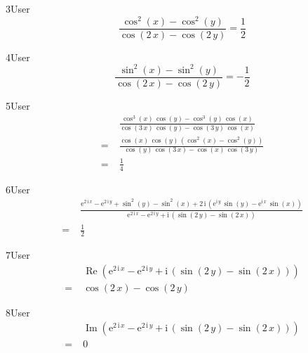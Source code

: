 \begin{espr}{3}{User}{\verificata}
\[
\frac{\cos^{2}\!\left(x\right) - \cos^{2}\!\left(y\right)}{\cos\!\left(2\, x\right) - \cos\!\left(2\, y\right)} = \frac{1}{2}
\]
\end{espr}
\begin{espr}{4}{User}{\verificata}
\[
\frac{\sin^{2}\!\left(x\right) - \sin^{2}\!\left(y\right)}{\cos\!\left(2\, x\right) - \cos\!\left(2\, y\right)} = -\frac{1}{2}
\]
\end{espr}
\begin{espr}{5}{User}{\verificata}
\begin{align*}
& \frac{\cos^{3}\!\left(x\right)\, \cos\!\left(y\right) - \cos^{3}\!\left(y\right)\, \cos\!\left(x\right)}{\cos\!\left(3\, x\right)\, \cos\!\left(y\right) - \cos\!\left(3\, y\right)\, \cos\!\left(x\right)} \\
=\;& \frac{\cos\!\left(x\right)\, \cos\!\left(y\right)\, \left(\cos^{2}\!\left(x\right) - \cos^{2}\!\left(y\right)\right)}{\cos\!\left(y\right)\, \cos\!\left(3\, x\right) - \cos\!\left(x\right)\, \cos\!\left(3\, y\right)} \\
=\;& \frac{1}{4}
\end{align*}
\end{espr}
\begin{espr}{6}{User}{\verificata}
\begin{align*}
& \frac{\mathrm{e}^{2\, \mathrm{i}\, x} - \mathrm{e}^{2\, \mathrm{i}\, y} + \sin^{2}\!\left(y\right) - \sin^{2}\!\left(x\right) + 2\, \mathrm{i}\, \left(\mathrm{e}^{\mathrm{i}\, y}\, \sin\!\left(y\right) - \mathrm{e}^{\mathrm{i}\, x}\, \sin\!\left(x\right)\right)}{\mathrm{e}^{2\, \mathrm{i}\, x} - \mathrm{e}^{2\, \mathrm{i}\, y} + \mathrm{i}\, \left(\sin\!\left(2\, y\right) - \sin\!\left(2\, x\right)\right)} \\
=\;& \frac{1}{2}
\end{align*}
\end{espr}
\begin{espr}{7}{User}{}
\begin{align*}
& \operatorname{Re}\!\left(\mathrm{e}^{2\, \mathrm{i}\, x} - \mathrm{e}^{2\, \mathrm{i}\, y} + \mathrm{i}\, \left(\sin\!\left(2\, y\right) - \sin\!\left(2\, x\right)\right)\right) \\
=\;& \cos\!\left(2\, x\right) - \cos\!\left(2\, y\right)
\end{align*}
\end{espr}
\begin{espr}{8}{User}{}
\begin{align*}
& \operatorname{Im}\!\left(\mathrm{e}^{2\, \mathrm{i}\, x} - \mathrm{e}^{2\, \mathrm{i}\, y} + \mathrm{i}\, \left(\sin\!\left(2\, y\right) - \sin\!\left(2\, x\right)\right)\right) \\
=\;& 0
\end{align*}
\end{espr}
